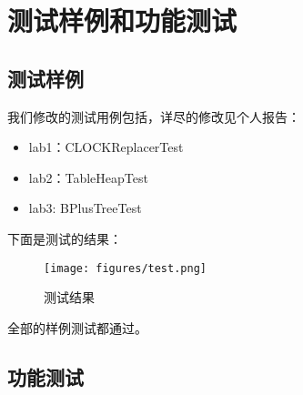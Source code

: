 \documentclass[12pt,hyperref,a4paper,UTF8]{ctexart}
\begin{document}
\section{测试样例和功能测试}

\subsection{测试样例}

我们修改的测试用例包括，详尽的修改见个人报告：
\begin{itemize}
    \item lab1：CLOCKReplacerTest
    \item lab2：TableHeapTest
    \item lab3: BPlusTreeTest
\end{itemize}

下面是测试的结果：

\begin{figure}[!ht]
    \centering
    \texttt{[image: figures/test.png]}
    \caption{测试结果}
    \label{fig:test1}
\end{figure}

全部的样例测试都通过。

\subsection{功能测试}
\end{document}
